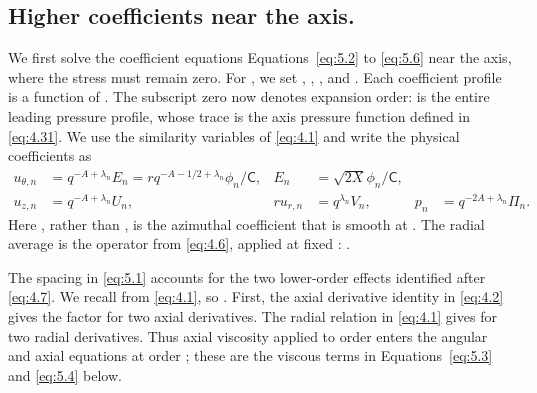 \subsection{Higher coefficients near the axis.}
\label{sec:5.1}
We first solve the coefficient equations Equations~\eqref{eq:5.2} to
\eqref{eq:5.6} near the axis, where the stress must remain zero. For
, we set
, ,
, and . Each
coefficient profile is a function of . The
subscript zero now denotes expansion order:
 is the entire leading pressure profile, whose
trace
%
 is the axis pressure function defined in
\eqref{eq:4.31}. We use the similarity variables of \eqref{eq:4.1} and write
the physical coefficients as
\begin{equation}
\label{eq:5.1}
\begin{aligned}
u_{\theta,n}&=q^{-A+\lambda_n}E_n
=rq^{-A-1/2+\lambda_n}\phi_n/\mathsf C,
& E_n&=\sqrt{2X}\phi_n/\mathsf C,\\
u_{z,n}&=q^{-A+\lambda_n}U_n,
& ru_{r,n}&=q^{\lambda_n}V_n,
& p_n&=q^{-2A+\lambda_n}\Pi_n.
\end{aligned}
\tag{5.1}
\end{equation}
Here , rather than
, is the azimuthal coefficient that is smooth at
. The radial average is the operator from
\eqref{eq:4.6}, applied at fixed :
.

The spacing  in \eqref{eq:5.1} accounts for the two
lower-order effects identified after \eqref{eq:4.7}. We recall
 from
\eqref{eq:4.1}, so . First, the axial
derivative identity in \eqref{eq:4.2} gives the factor
 for two axial derivatives. The
radial relation  in \eqref{eq:4.1} gives
 for two radial derivatives. Thus axial viscosity
applied to order  enters the angular and axial
equations at order ; these are the
 viscous terms in Equations~\eqref{eq:5.3}
and \eqref{eq:5.4} below.

